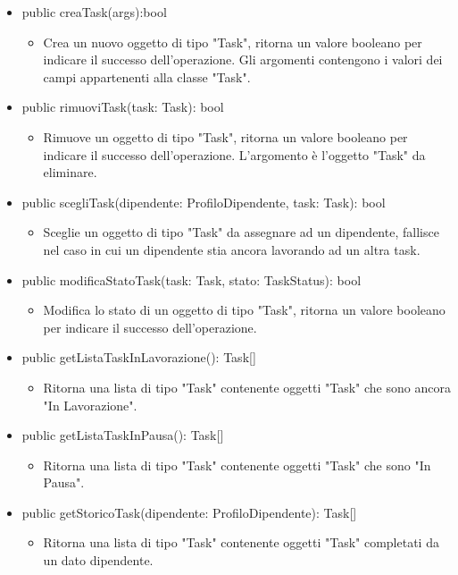 \documentclass{report}
\begin{document}
\begin{itemize}
\item public creaTask(args):bool
\begin{itemize}
    \item Crea un nuovo oggetto di tipo "Task", ritorna un valore booleano per indicare il successo dell'operazione. Gli argomenti contengono i valori dei campi appartenenti alla classe "Task".
\end{itemize}
\item public rimuoviTask(task: Task): bool
\begin{itemize}
    \item Rimuove un oggetto di tipo "Task", ritorna un valore booleano per indicare il successo dell'operazione. L'argomento è l'oggetto "Task" da eliminare.
\end{itemize}
\item public scegliTask(dipendente: ProfiloDipendente, task: Task): bool
\begin{itemize}
    \item Sceglie un oggetto di tipo "Task" da assegnare ad un dipendente, fallisce nel caso in cui un dipendente stia ancora lavorando ad un altra task.
\end{itemize}
\item public modificaStatoTask(task: Task, stato: TaskStatus): bool
\begin{itemize}
    \item Modifica lo stato di un oggetto di tipo "Task", ritorna un valore booleano per indicare il successo dell'operazione.
\end{itemize}
\item public getListaTaskInLavorazione(): Task[]
\begin{itemize}
    \item Ritorna una lista di tipo "Task" contenente oggetti "Task" che sono ancora "In Lavorazione".
\end{itemize}
\item public getListaTaskInPausa(): Task[]
\begin{itemize}
    \item Ritorna una lista di tipo "Task" contenente oggetti "Task" che sono "In Pausa".
\end{itemize}
\item public getStoricoTask(dipendente: ProfiloDipendente): Task[]
\begin{itemize}
    \item Ritorna una lista di tipo "Task" contenente oggetti "Task" completati da un dato dipendente.

\end{itemize}
\end{itemize}
\end{document}
